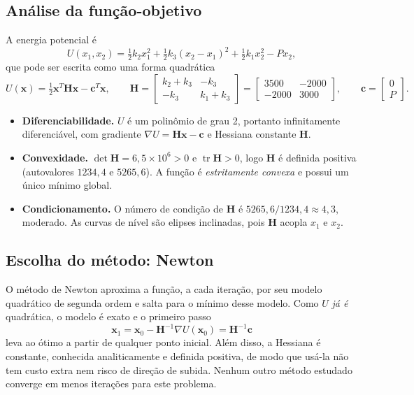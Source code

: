 \documentclass[12pt,a4paper]{article}
\begin{document}
\subsection{Análise da função-objetivo}

A energia potencial é
\begin{equation}
U(x_1,x_2) = \tfrac12 k_2x_1^2 + \tfrac12 k_3(x_2-x_1)^2 + \tfrac12 k_1x_2^2 - Px_2,
\end{equation}
que pode ser escrita como uma forma quadrática
\begin{equation}
U(\mathbf{x}) = \tfrac12\mathbf{x}^T\mathbf{H}\mathbf{x} - \mathbf{c}^T\mathbf{x}, \qquad
\mathbf{H} = \begin{bmatrix} k_2+k_3 & -k_3\\ -k_3 & k_1+k_3\end{bmatrix} = \begin{bmatrix} 3500 & -2000\\ -2000 & 3000\end{bmatrix}, \qquad
\mathbf{c} = \begin{bmatrix}0\\P\end{bmatrix}.
\end{equation}

\begin{itemize}
  \item \textbf{Diferenciabilidade.} $U$ é um polinômio de grau 2, portanto infinitamente diferenciável, com gradiente $\nabla U = \mathbf{H}\mathbf{x}-\mathbf{c}$ e Hessiana constante $\mathbf{H}$.
  \item \textbf{Convexidade.} $\det\mathbf{H} = 6{,}5\times10^6>0$ e $\operatorname{tr}\mathbf{H}>0$, logo $\mathbf{H}$ é definida positiva (autovalores $1234{,}4$ e $5265{,}6$). A função é \emph{estritamente convexa} e possui um único mínimo global.
  \item \textbf{Condicionamento.} O número de condição de $\mathbf{H}$ é $5265{,}6/1234{,}4\approx4{,}3$, moderado. As curvas de nível são elipses inclinadas, pois $\mathbf{H}$ acopla $x_1$ e $x_2$.
\end{itemize}

\subsection{Escolha do método: Newton}

O método de Newton aproxima a função, a cada iteração, por seu modelo quadrático de segunda ordem e salta para o mínimo desse modelo. Como $U$ \emph{já é} quadrática, o modelo é exato e o primeiro passo
\begin{equation}
\mathbf{x}_1 = \mathbf{x}_0 - \mathbf{H}^{-1}\nabla U(\mathbf{x}_0) = \mathbf{H}^{-1}\mathbf{c}
\end{equation}
leva ao ótimo a partir de qualquer ponto inicial. Além disso, a Hessiana é constante, conhecida analiticamente e definida positiva, de modo que usá-la não tem custo extra nem risco de direção de subida. Nenhum outro método estudado converge em menos iterações para este problema.
\end{document}
